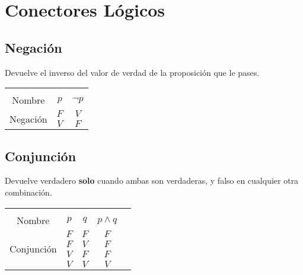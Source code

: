\documentclass[12pt, fleqn]{report}                             %
\begin{document}
        \clearpage
        \section{Conectores Lógicos}

            \subsection{Negación}

                Devuelve el inverso del valor de verdad de la proposición que le pases.\\

                \begin{tabular}{ |c|c|c| } 
                    \hline &&\\
                    \large{Nombre} & $p$ & $\lnot p$ \\[0.5em]
                    \hline
                    \multirow{2}{5em}{Negación}
                    & $F$ & $V$  \\ \cline{2-3}
                    & $V$ & $F$  \\ \cline{2-3}
                    \hline
                \end{tabular}

            \subsection{Conjunción}

                Devuelve verdadero \textbf{solo} cuando ambas son verdaderas, y falso en cualquier
                otra combinación.\\

                \begin{tabular}{ |c|c|c|c|c| } 
                    \hline &&&\\
                    \large{Nombre} & $p$ & $q$ & $p \land q$ \\[0.5em]
                    \hline
                    \multirow{4}{5em}{Conjunción}
                    & $F$ & $F$ & $F$ \\ \cline{2-4}
                    & $F$ & $V$ & $F$ \\ \cline{2-4}
                    & $V$ & $F$ & $F$ \\ \cline{2-4}
                    & $V$ & $V$ & $V$ \\ 
                    \hline
                \end{tabular}
\end{document}
